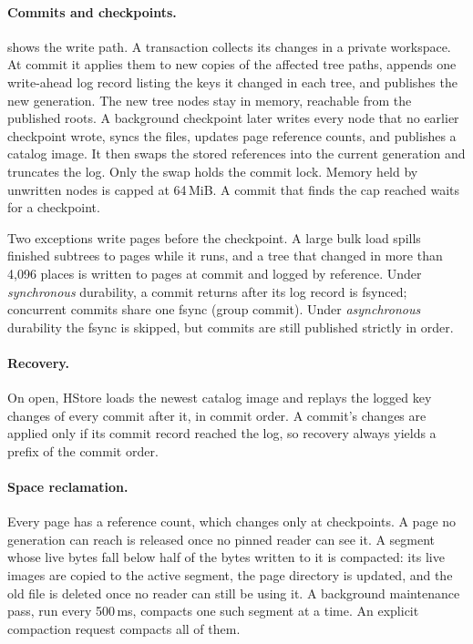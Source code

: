 \paragraph{Commits and checkpoints.}  shows the write path. A transaction collects its changes in a private workspace. At commit it applies them to new copies of the affected tree paths, appends one write-ahead log record listing the keys it changed in each tree, and publishes the new generation. The new tree nodes stay in memory, reachable from the published roots. A background checkpoint later writes every node that no earlier checkpoint wrote, syncs the files, updates page reference counts, and publishes a catalog image. It then swaps the stored references into the current generation and truncates the log. Only the swap holds the commit lock. Memory held by unwritten nodes is capped at 64\,MiB. A commit that finds the cap reached waits for a checkpoint.

Two exceptions write pages before the checkpoint. A large bulk load spills finished subtrees to pages while it runs, and a tree that changed in more than 4,096 places is written to pages at commit and logged by reference. Under \emph{synchronous} durability, a commit returns after its log record is fsynced; concurrent commits share one fsync (group commit). Under \emph{asynchronous} durability the fsync is skipped, but commits are still published strictly in order.

\paragraph{Recovery.} On open, HStore loads the newest catalog image and replays the logged key changes of every commit after it, in commit order. A commit's changes are applied only if its commit record reached the log, so recovery always yields a prefix of the commit order.

\paragraph{Space reclamation.} Every page has a reference count, which changes only at checkpoints. A page no generation can reach is released once no pinned reader can see it. A segment whose live bytes fall below half of the bytes written to it is compacted: its live images are copied to the active segment, the page directory is updated, and the old file is deleted once no reader can still be using it. A background maintenance pass, run every 500\,ms, compacts one such segment at a time. An explicit compaction request compacts all of them.

